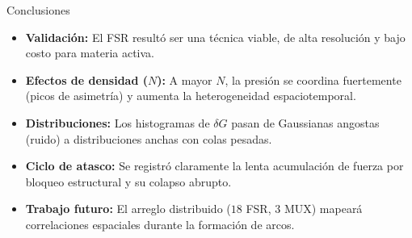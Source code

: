 \documentclass[a0paper,portrait,fontscale=0.292,margin=0.7cm]{baposter}
\begin{document}
\begin{poster}
		\begin{posterbox}[name=conclusiones,column=2,below=estudio,above=bottom,span=3]{{Conclusiones}}
			\smallskip
			\begin{itemize}[leftmargin=3.3em,rightmargin=3.3em,itemsep=0em,topsep=0.8em]
				\item \textbf{Validaci\'on:} El FSR result\'o ser una t\'ecnica viable, de alta resoluci\'on y bajo costo para materia activa.
				\item \textbf{Efectos de densidad ($N$):} A mayor $N$, la presi\'on se coordina fuertemente (picos de asimetr\'ia) y aumenta la heterogeneidad espaciotemporal.
				\item \textbf{Distribuciones:} Los histogramas de $\delta G$ pasan de Gaussianas angostas (ruido) a distribuciones anchas con colas pesadas.
				\item \textbf{Ciclo de atasco:} Se registr\'o claramente la lenta acumulaci\'on de fuerza por bloqueo estructural y su colapso abrupto.
				\item \textbf{Trabajo futuro:} El arreglo distribuido ($18$ FSR, $3$ MUX) mapear\'a correlaciones espaciales durante la formaci\'on de arcos.
			\end{itemize}
		\end{posterbox}
		
	\end{poster}
	\shorthandon{>}
\end{document}
